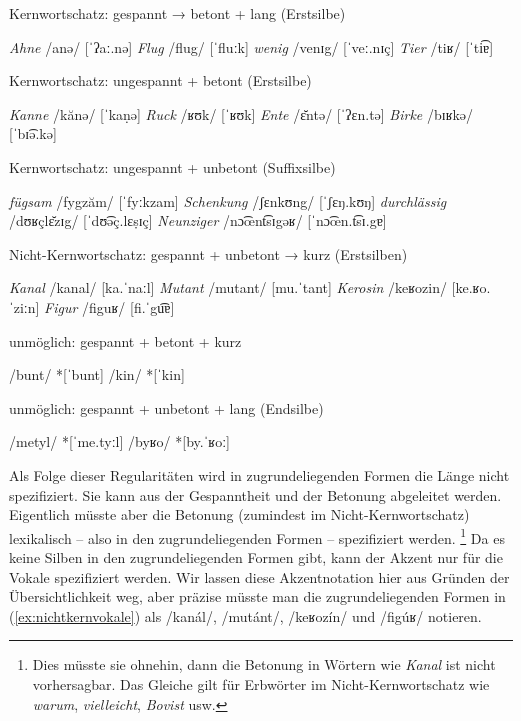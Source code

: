 \begin{exe}
  \ex Kernwortschatz: gespannt → betont + lang (Erstsilbe) \label{ex:gespannt}
  \begin{xlist}
    \ex \textit{Ahne} /anə/ [ˈʔaː.nə]
    \ex \textit{Flug} /flug/ [ˈfluːk]
    \ex \textit{wenig} /venɪg/ [ˈveː.nɪç]
    \ex \textit{Tier} /tiʁ/ [ˈti͡ɐ] \label{ex:gespanntsekdiphth}
  \end{xlist}
  \ex Kernwortschatz: ungespannt + betont (Erstsilbe)\label{ex:ungespanntbetont}
  \begin{xlist}
    \ex \textit{Kanne} /kănə/ [ˈkaṇə]
    \ex \textit{Ruck} /ʁʊk/ [ˈʁʊk]
    \ex \textit{Ente} /ɛ̆ntə/ [ˈʔɛn.tə]
    \ex \textit{Birke} /bɪʁkə/ [ˈbɪ͡ə.kə]
  \end{xlist}
  \ex Kernwortschatz: ungespannt + unbetont (Suffixsilbe) \label{ex:ungespanntunbetont}
  \begin{xlist}
    \ex \textit{fügsam} /fygzăm/ [ˈfyːkzam]
    \ex \textit{Schenkung} /ʃɛnkʊng/ [ˈʃɛŋ.kʊŋ]
    \ex \textit{durchlässig} /dʊʁçlɛ̆zɪg/ [ˈdʊ͡əç.lɛṣɪç]
    \ex \textit{Neunziger} /nɔ͡œnt͡sɪgəʁ/ [ˈnɔ͡œn.t͡sɪ.gɐ]
  \end{xlist}
  \ex Nicht-Kernwortschatz: gespannt + unbetont → kurz (Erstsilben) \label{ex:nichtkernvokale}
  \begin{xlist}
    \ex \textit{Kanal} /kanal/ [ka.ˈnaːl]
    \ex \textit{Mutant} /mutant/ [mu.ˈtant]
    \ex \textit{Kerosin} /keʁozin/ [ke.ʁo.ˈziːn]
    \ex \textit{Figur} /figuʁ/ [fi.ˈgu͡ɐ]
  \end{xlist}
  \ex unmöglich: gespannt + betont + kurz \label{ex:gespanntfalschkurz}
  \begin{xlist}
    \ex /bunt/ *[ˈbunt]
    \ex /kin/ *[ˈkin]
  \end{xlist}
  \ex unmöglich: gespannt + unbetont + lang (Endsilbe) \label{ex:gespanntfalschlang}
  \begin{xlist}
    \ex /metyl/ *[ˈme.tyːl]
    \ex /byʁo/ *[by.ˈʁoː]
  \end{xlist}
\end{exe}

Als Folge dieser Regularitäten wird in zugrundeliegenden Formen die Länge nicht spezifiziert.
Sie kann aus der Gespanntheit und der Betonung abgeleitet werden.
Eigentlich müsste aber die Betonung (zumindest im Nicht-Kernwortschatz) lexikalisch -- also in den zugrundeliegenden Formen -- spezifiziert werden.%
\footnote{Dies müsste sie ohnehin, dann die Betonung in Wörtern wie \textit{Kanal} ist nicht vorhersagbar.
Das Gleiche gilt für Erbwörter im Nicht-Kernwortschatz wie \textit{warum}, \textit{vielleicht}, \textit{Bovist} usw.}
Da es keine Silben in den zugrundeliegenden Formen gibt, kann der Akzent nur für die Vokale spezifiziert werden.
Wir lassen diese Akzentnotation hier aus Gründen der Übersichtlichkeit weg, aber präzise müsste man die zugrundeliegenden Formen in (\ref{ex:nichtkernvokale}) als /kanál/, /mutánt/, /keʁozín/ und /figúʁ/ notieren.

